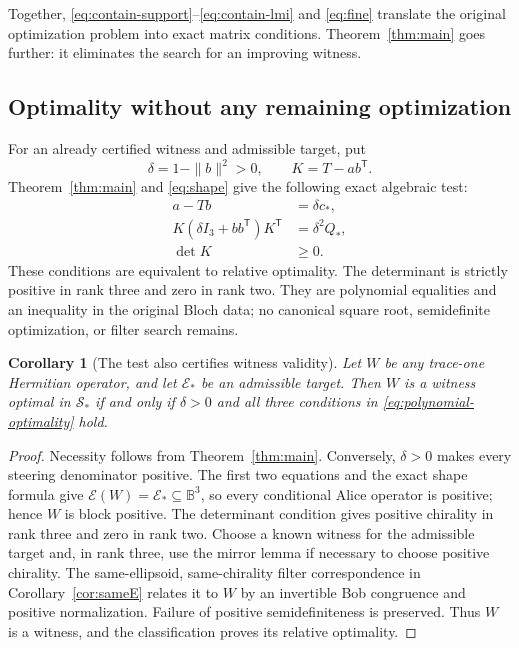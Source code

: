 \documentclass[11pt,a4paper]{article}
\newtheorem{corollary}[theorem]{Corollary}
\theoremstyle{definition}\newtheorem{definition}[theorem]{Definition}
\newcommand{\B}{\mathbb B^3}
\newcommand{\E}{\mathcal E}
\newcommand{\cstar}{c_*}
\newcommand{\Qstar}{Q_*}
\newcommand{\Sstar}{\mathcal S_*}
\theoremstyle{plain}\newtheorem*{theorem*}{Theorem}
\begin{document}
Together, \eqref{eq:contain-support}--\eqref{eq:contain-lmi} and \eqref{eq:fine} translate the original optimization problem into exact matrix conditions. Theorem~\ref{thm:main} goes further: it eliminates the search for an improving witness.

\subsection{Optimality without any remaining optimization}

For an already certified witness and admissible target, put
\[
 \delta=1-\|b\|^2>0,\qquad K=T-ab^{\mathsf T}.
\]
Theorem~\ref{thm:main} and \eqref{eq:shape} give the following exact algebraic test:
\begin{equation}\label{eq:polynomial-optimality}
 \boxed{\begin{aligned}
 a-Tb&=\delta\cstar,\\
 K(\delta I_3+bb^{\mathsf T})K^{\mathsf T}&=\delta^2\Qstar,\\
 \det K&\geq0.
 \end{aligned}}
\end{equation}
These conditions are equivalent to relative optimality. The determinant is strictly positive in rank three and zero in rank two. They are polynomial equalities and an inequality in the original Bloch data; no canonical square root, semidefinite optimization, or filter search remains.

\begin{corollary}[The test also certifies witness validity]\label{cor:algebraic-validity}
Let $W$ be any trace-one Hermitian operator, and let $\E_*$ be an admissible target. Then $W$ is a witness optimal in $\Sstar$ if and only if $\delta>0$ and all three conditions in \eqref{eq:polynomial-optimality} hold.
\end{corollary}
\begin{proof}
Necessity follows from Theorem~\ref{thm:main}. Conversely, $\delta>0$ makes every steering denominator positive. The first two equations and the exact shape formula give $\E(W)=\E_*\subseteq\B$, so every conditional Alice operator is positive; hence $W$ is block positive. The determinant condition gives positive chirality in rank three and zero in rank two. Choose a known witness for the admissible target and, in rank three, use the mirror lemma if necessary to choose positive chirality. The same-ellipsoid, same-chirality filter correspondence in Corollary~\ref{cor:sameE} relates it to $W$ by an invertible Bob congruence and positive normalization. Failure of positive semidefiniteness is preserved. Thus $W$ is a witness, and the classification proves its relative optimality.
\end{proof}
\end{document}
